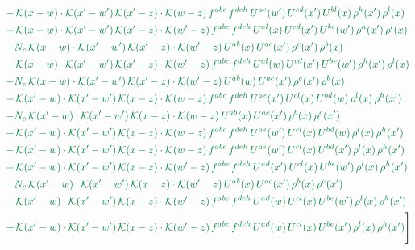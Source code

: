 \documentclass[10pt]{article}
\numberwithin{equation}{section}
\begin{document}
\begin{align}
&{\color{JIM} -\,\mathcal{K}(x-w)\cdot\mathcal{K}(x'-w')\,\mathcal{K}(x'-z)\cdot\mathcal{K}(w-z)\,f^{abc}\,f^{deh}\,U^{ae}(w')\,U^{cd}(x')\,U^{bl}(x)\,\rho^{h}(x')\,\rho^{l}(x)} \notag\\
&{\color{JIM} +\,\mathcal{K}(x-w)\cdot\mathcal{K}(x'-w')\,\mathcal{K}(x'-z)\cdot\mathcal{K}(w'-z)\,f^{abc}\,f^{deh}\,U^{al}(x)\,U^{cd}(x')\,U^{be}(w')\,\rho^{h}(x')\,\rho^{l}(x)} \notag\\
&{\color{JIM} +N_{c}\,\mathcal{K}(x-w)\cdot\mathcal{K}(x'-w')\,\mathcal{K}(x'-z)\cdot\mathcal{K}(w'-z)\,U^{ab}(x)\,U^{ac}(x')\,\rho^{c}(x')\,\rho^{b}(x)} \notag\\
&{\color{JIM} -\,\mathcal{K}(x-w)\cdot\mathcal{K}(x'-w')\,\mathcal{K}(x'-z)\cdot\mathcal{K}(w'-z)\,f^{abc}\,f^{deh}\,U^{al}(w)\,U^{cd}(x')\,U^{be}(w')\,\rho^{h}(x')\,\rho^{l}(x)} \notag\\
&{\color{JIM} -N_{c}\,\mathcal{K}(x-w)\cdot\mathcal{K}(x'-w')\,\mathcal{K}(x'-z)\cdot\mathcal{K}(w'-z)\,U^{ab}(w)\,U^{ac}(x')\,\rho^{c}(x')\,\rho^{b}(x)} \notag\\
&{\color{JIM} -\,\mathcal{K}(x'-w)\cdot\mathcal{K}(x'-w')\,\mathcal{K}(x-z)\cdot\mathcal{K}(w-z)\,f^{abc}\,f^{deh}\,U^{ae}(x')\,U^{cl}(x)\,U^{bd}(w)\,\rho^{l}(x)\,\rho^{h}(x')} \notag\\
&{\color{JIM} -N_{c}\,\mathcal{K}(x'-w)\cdot\mathcal{K}(x'-w')\,\mathcal{K}(x-z)\cdot\mathcal{K}(w-z)\,U^{ab}(x)\,U^{ac}(x')\,\rho^{b}(x)\,\rho^{c}(x')} \notag\\
&{\color{JIM} +\,\mathcal{K}(x'-w)\cdot\mathcal{K}(x'-w')\,\mathcal{K}(x-z)\cdot\mathcal{K}(w-z)\,f^{abc}\,f^{deh}\,U^{ae}(w')\,U^{cl}(x)\,U^{bd}(w)\,\rho^{l}(x)\,\rho^{h}(x')} \notag\\
&{\color{JIM} -\,\mathcal{K}(x'-w)\cdot\mathcal{K}(x'-w')\,\mathcal{K}(x-z)\cdot\mathcal{K}(w-z)\,f^{abc}\,f^{deh}\,U^{ae}(w')\,U^{cl}(x)\,U^{bd}(x')\,\rho^{l}(x)\,\rho^{h}(x')} \notag\\
&{\color{JIM} +\,\mathcal{K}(x'-w)\cdot\mathcal{K}(x'-w')\,\mathcal{K}(x-z)\cdot\mathcal{K}(w'-z)\,f^{abc}\,f^{deh}\,U^{ad}(x')\,U^{cl}(x)\,U^{be}(w')\,\rho^{l}(x)\,\rho^{h}(x')} \notag\\
&{\color{JIM} -N_{c}\,\mathcal{K}(x'-w)\cdot\mathcal{K}(x'-w')\,\mathcal{K}(x-z)\cdot\mathcal{K}(w'-z)\,U^{ab}(x)\,U^{ac}(x')\,\rho^{b}(x)\,\rho^{c}(x')} \notag\\
&{\color{JIM} -\,\mathcal{K}(x'-w)\cdot\mathcal{K}(x'-w')\,\mathcal{K}(x-z)\cdot\mathcal{K}(w'-z)\,f^{abc}\,f^{deh}\,U^{ad}(w)\,U^{cl}(x)\,U^{be}(w')\,\rho^{l}(x)\,\rho^{h}(x')} \notag\\
&{\color{JIM} +\,\mathcal{K}(x'-w)\cdot\mathcal{K}(x'-w')\,\mathcal{K}(x-z)\cdot\mathcal{K}(w'-z)\,f^{abc}\,f^{deh}\,U^{ad}(w)\,U^{cl}(x)\,U^{be}(x')\,\rho^{l}(x)\,\rho^{h}(x')}\Bigg] \end{align}
\end{document}
